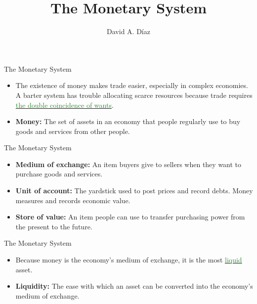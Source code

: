 \documentclass[xcolor={dvipsnames},pdf, hyperref={colorlinks=true, citecolor=ForestGreen, linkcolor=BlueViolet, urlcolor=Magenta}]{beamer}
\title{The Monetary System}
\author{David A. D\'iaz }
\institute{UNC Chapel Hill}
\date{}
\theoremstyle{definition}
\newcommand{\defn}[1]{\textbf{#1}}
\newcommand{\dd}[1]{{\underline{\textcolor{ForestGreen}{#1}}}}
\begin{document}
 
	
	\begin{frame}
		
		\titlepage
		
	\end{frame}

\begin{frame}{The Monetary System}
\begin{itemize}
	\item The existence of money makes trade easier, especially in complex economies. A barter system has trouble allocating scarce resources because trade requires \dd{the double coincidence of wants}.
	\item \defn{Money:} The set of assets in an economy that people regularly use to buy goods and services from other people.
\end{itemize}
\end{frame}


\begin{frame}{The Monetary System}
\begin{itemize}
	\item \defn{Medium of exchange:} An item buyers give to sellers when they want to purchase goods and services.
	
	\item \defn{Unit of account:} The yardstick used to post prices and record debts. Money measures and records economic value.
	
	\item \defn{Store of value:} An item people can use to transfer purchasing power from the present to the future.


\end{itemize}
\end{frame}

\begin{frame}{The Monetary System}
\begin{itemize}

	
	\item Because money is the economy's medium of exchange, it is the most \dd{liquid} asset.
	\item \defn{Liquidity:} The ease with which an asset can be converted into the economy's medium of exchange.
	
	
\end{itemize}
\end{frame}
\end{document}
